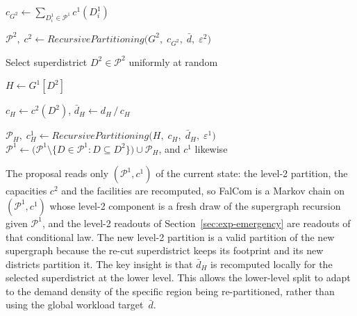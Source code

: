 \documentclass[preprint,12pt,authoryear]{elsarticle}
\theoremstyle{definition}
\begin{document}
\begin{algorithm}[H]
\LinesNumbered
\caption{Hierarchical proposal}\label{alg:proposal}

\BlankLine
{}

$c_{G^2} \leftarrow \sum_{D_i^1 \in \mathcal{P}^1} c^1(D_i^1)$\;

$\mathcal{P}^2,\; c^2 \leftarrow
    \textit{RecursivePartitioning}\bigl(G^2,\; c_{G^2},\;
    \bar{d},\; \varepsilon^2\bigr)$ 

Select superdistrict $D^2 \in \mathcal{P}^2$ uniformly at random\;

\BlankLine
{}

$H \leftarrow G^1[D^2]$\;

$c_H \leftarrow c^2(D^2)$, \quad $\bar{d}_H \leftarrow d_H \,/\, c_H$\;

$\mathcal{P}_H,\; c^1_H \leftarrow \textit{RecursivePartitioning}\bigl(H,\; c_H,\; \bar{d}_H,\; \varepsilon^1\bigr)$ 
$\mathcal{P}^1 \leftarrow \bigl(\mathcal{P}^1 \setminus \{D \in \mathcal{P}^1 : D \subseteq D^2\}\bigr) \cup \mathcal{P}_H$, and $c^1$ likewise\;

\end{algorithm}
\medskip
\medskip

The proposal reads only $(\mathcal{P}^1, c^1)$ of the current state: the level-2 partition, the capacities $c^2$ and the facilities are recomputed, so FalCom is a Markov chain on $(\mathcal{P}^1, c^1)$ whose level-2 component is a fresh draw of the supergraph recursion given $\mathcal{P}^1$, and the level-2 readouts of Section~\ref{sec:exp-emergency} are readouts of that conditional law. The new level-2 partition is a valid partition of the new supergraph because the re-cut superdistrict keeps its footprint and its new districts partition it. The key insight is that $\bar{d}_H$ is recomputed locally for the selected superdistrict at the lower level.  This allows the lower-level split to adapt
to the demand density of the specific region being re-partitioned, rather than
using the global workload target~$\bar{d}$.
\end{document}
